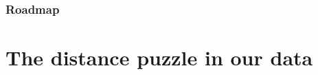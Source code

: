 \documentclass{beamer}
\begin{document}

\begin{frame}[plain]\frametitle{Roadmap}\tableofcontents
\end{frame} 

\section{The distance puzzle in our data}
\end{document}
